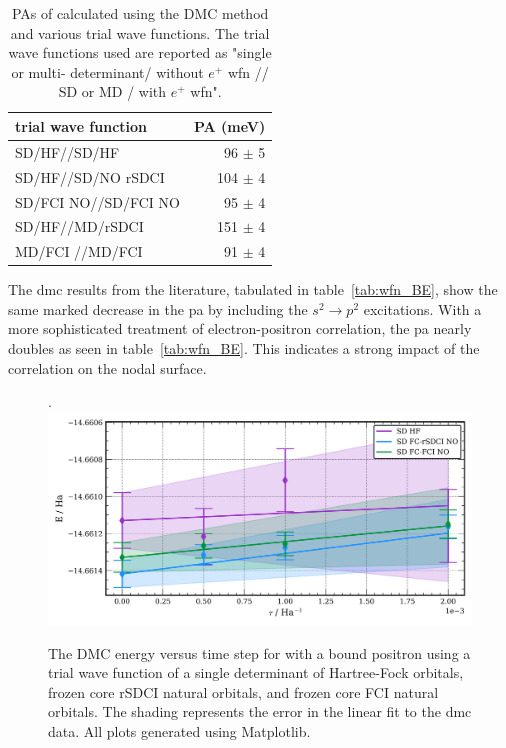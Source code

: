 \begin{table}
    \caption{\label{tab:DMC_BE} PAs of  calculated using the DMC method and various trial wave functions. The trial wave functions used are reported as "single or multi- determinant/ without $e^{+}$ wfn // SD or MD / with $e^{+}$ wfn". }
    \begin{tabular}{lr}
trial wave function          &  PA (meV) \\ \hline
SD/HF//SD/HF                 &  96  $\pm$ 5 \\
SD/HF//SD/NO rSDCI           &  104 $\pm$ 4 \\
SD/FCI NO//SD/FCI NO         &  95  $\pm$ 4 \\ \hline
SD/HF//MD/rSDCI              &  151 $\pm$ 4 \\
MD/FCI   //MD/FCI            &  91 $\pm$  4 \\
\end{tabular}
\end{table}

The \gls{dmc} results from the literature, tabulated in table~\ref{tab:wfn_BE}, show the same marked decrease in the \gls{pa} by including the $s^2\rightarrow p^2$ excitations.
With a more sophisticated treatment of electron-positron correlation, the \gls{pa} nearly doubles as seen in table~\ref{tab:wfn_BE}.\cite{10.1021/acs.jctc.1c01193}
This indicates a strong impact of the correlation on the nodal surface.

\begin{figure}
    \caption{\label{fig:be_sd_extrap} The DMC energy versus time step for  with a bound positron using a trial wave function of a single determinant of Hartree-Fock orbitals, frozen core rSDCI natural orbitals, and frozen core FCI natural orbitals. The shading represents the error in the linear fit to the \gls{dmc} data. All plots generated using Matplotlib.\cite{10.1109/MCSE.2007.55}}.
    \includegraphics[width=\columnwidth,keepaspectratio]{Images/chapter5/be_extrap_singdet.png}
\end{figure}

